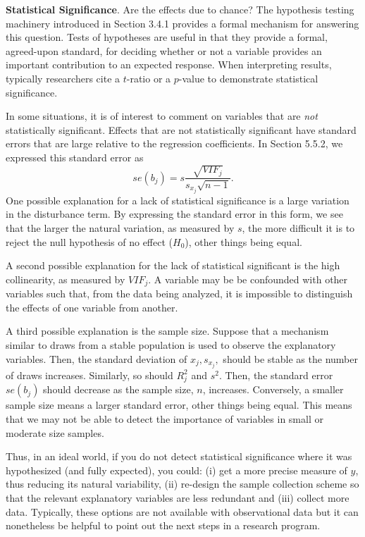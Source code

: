 

\noindent \textbf{Statistical Significance}. Are the effects due to
chance? The hypothesis testing machinery introduced in Section 3.4.1
provides a formal mechanism for answering this question. Tests of
hypotheses are useful in that they provide a formal, agreed-upon
standard, for deciding whether or not a variable provides an
important contribution to an expected response. When interpreting
results, typically researchers cite a $t$-ratio or a $p$-value to
demonstrate statistical significance.

In some situations, it is of interest to comment on variables that
are \emph{not} statistically significant. Effects that are not
statistically significant have standard errors that are large
relative to the regression coefficients. In Section 5.5.2, we
expressed this standard error as
\begin{equation}\label{E6:StdErrorBeta}
se(b_{j})=s\frac{\sqrt{VIF_{j}}}{s_{x_{j}}\sqrt{n-1}}.
\end{equation}
One possible explanation for a lack of statistical significance is a
large variation in the disturbance term. By expressing the standard
error in this form, we see that the larger the natural variation, as
measured by $s$, the more difficult it is to reject the null
hypothesis of no effect ($H_0$), other things being equal.

A second possible explanation for the lack of statistical
significant is the high collinearity, as measured by $VIF_j$. A
variable may be be confounded with other variables such that, from
the data being analyzed, it is impossible to distinguish the effects
of one variable from another.

A third possible explanation is the sample size. Suppose that a
mechanism similar to draws from a stable population is used to
observe the explanatory variables. Then, the standard deviation of
$x_j,s_{x_j},$ should be stable as the number of draws increases.
Similarly, so should $R_j^2$ and $s^2$. Then, the standard error
$se(b_j)$ should decrease as the sample size, $n$, increases.
Conversely, a smaller sample size means a larger standard error,
other things being equal. This means that we may not be able to
detect the importance of variables in small or moderate size
samples.

Thus, in an ideal world, if you do not detect statistical
significance where it was hypothesized (and fully expected), you
could: (i) get a more precise measure of $y$, thus reducing its
natural variability, (ii) re-design the sample collection scheme so
that the relevant explanatory variables are less redundant and (iii)
collect more data. Typically, these options are not available with
observational data but it can nonetheless be helpful to point out
the next steps in a research program.


